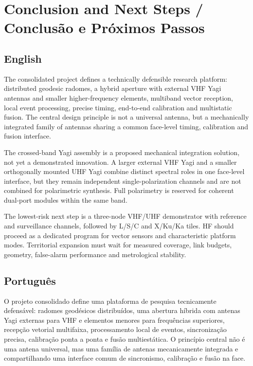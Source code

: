 \chapter{Conclusion and Next Steps / Conclusão e Próximos Passos}

\section*{English}
The consolidated project defines a technically defensible research platform: distributed geodesic radomes, a hybrid aperture with external VHF Yagi antennas and smaller higher-frequency elements, multiband vector reception, local event processing, precise timing, end-to-end calibration and multistatic fusion. The central design principle is not a universal antenna, but a mechanically integrated family of antennas sharing a common face-level timing, calibration and fusion interface.

The crossed-band Yagi assembly is a proposed mechanical integration solution, not yet a demonstrated innovation. A larger external VHF Yagi and a smaller orthogonally mounted UHF Yagi combine distinct spectral roles in one face-level interface, but they remain independent single-polarization channels and are not combined for polarimetric synthesis. Full polarimetry is reserved for coherent dual-port modules within the same band.

The lowest-risk next step is a three-node VHF/UHF demonstrator with reference and surveillance channels, followed by L/S/C and X/Ku/Ka tiles. HF should proceed as a dedicated program for vector sensors and characteristic platform modes. Territorial expansion must wait for measured coverage, link budgets, geometry, false-alarm performance and metrological stability.

\section*{Português}
O projeto consolidado define uma plataforma de pesquisa tecnicamente defensável: radomes geodésicos distribuídos, uma abertura híbrida com antenas Yagi externas para VHF e elementos menores para frequências superiores, recepção vetorial multifaixa, processamento local de eventos, sincronização precisa, calibração ponta a ponta e fusão multiestática. O princípio central não é uma antena universal, mas uma família de antenas mecanicamente integrada e compartilhando uma interface comum de sincronismo, calibração e fusão na face.

